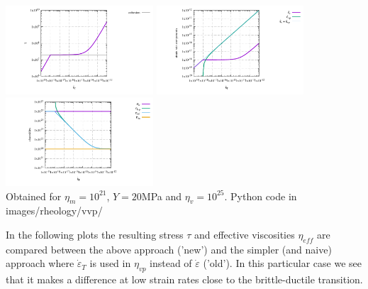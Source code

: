 \begin{itemize}
\begin{center}
\includegraphics[width=5.5cm]{images/rheology/vvp/tau.pdf}
\includegraphics[width=5.5cm]{images/rheology/vvp/strainrates.pdf}
\includegraphics[width=5.5cm]{images/rheology/vvp/viscosities.pdf}\\
{\captionfont Obtained for $\eta_m=10^{21}$, $Y=20$MPa and $\eta_v=10^{25}$. Python code 
in images/rheology/vvp/}
\end{center}

In the following plots the resulting stress $\tau$ and effective viscosities $\eta_{eff}$
are compared between the above approach ('new') and the simpler (and naive) 
approach where $\dot\varepsilon_T$ 
is used in $\eta_{vp}$ instead of $\dot\varepsilon$ ('old'). In this particular case 
we see that it makes a difference at low strain rates close to the brittle-ductile transition.


\end{itemize}
